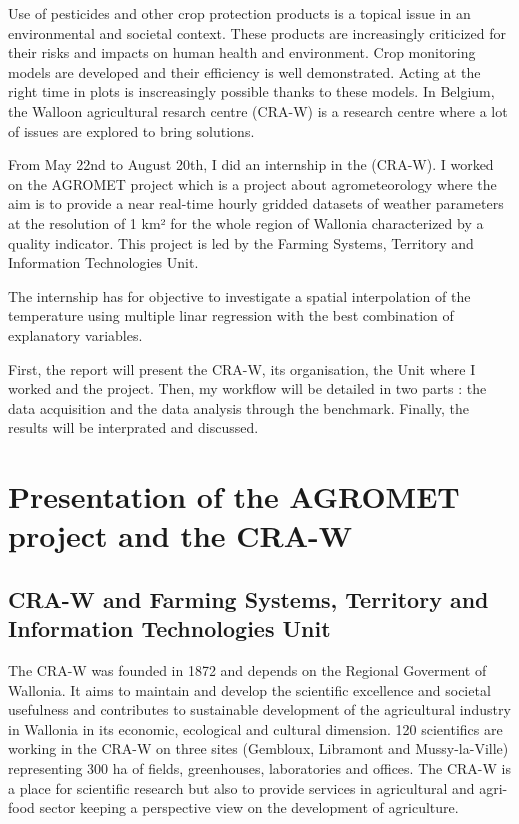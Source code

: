 \documentclass[12pt,twoside]{reedthesis}
\theoremstyle{definition}
\theoremstyle{definition}
\theoremstyle{definition}
\theoremstyle{remark}
\begin{document}
Use of pesticides and other crop protection products is a topical issue
in an environmental and societal context. These products are
increasingly criticized for their risks and impacts on human health and
environment. Crop monitoring models are developed and their efficiency
is well demonstrated. Acting at the right time in plots is inscreasingly
possible thanks to these models. In Belgium, the Walloon agricultural
resarch centre (CRA-W) is a research centre where a lot of issues are
explored to bring solutions.

From May 22nd to August 20th, I did an internship in the (CRA-W). I
worked on the AGROMET project which is a project about agrometeorology
where the aim is to provide a near real-time hourly gridded datasets of
weather parameters at the resolution of 1 km² for the whole region of
Wallonia characterized by a quality indicator. This project is led by
the Farming Systems, Territory and Information Technologies Unit.

The internship has for objective to investigate a spatial interpolation
of the temperature using multiple linar regression with the best
combination of explanatory variables.

First, the report will present the CRA-W, its organisation, the Unit
where I worked and the project. Then, my workflow will be detailed in
two parts : the data acquisition and the data analysis through the
benchmark. Finally, the results will be interprated and discussed.

\chapter{Presentation of the AGROMET project and the
CRA-W}\label{presentation}

\section{CRA-W and Farming Systems, Territory and Information
Technologies
Unit}\label{cra-w-and-farming-systems-territory-and-information-technologies-unit}

The CRA-W was founded in 1872 and depends on the Regional Goverment of
Wallonia. It aims to maintain and develop the scientific excellence and
societal usefulness and contributes to sustainable development of the
agricultural industry in Wallonia in its economic, ecological and
cultural dimension. 120 scientifics are working in the CRA-W on three
sites (Gembloux, Libramont and Mussy-la-Ville) representing 300 ha of
fields, greenhouses, laboratories and offices. The CRA-W is a place for
scientific research but also to provide services in agricultural and
agri-food sector keeping a perspective view on the development of
agriculture.
\end{document}
